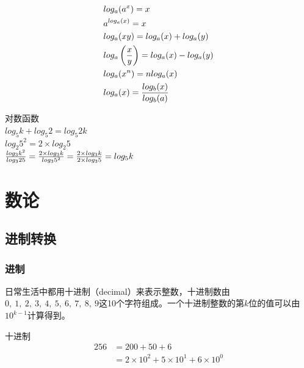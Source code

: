 \documentclass[12pt, openany, oneside]{book}
\begin{document}
\begin{tcolorbox}
	\begin{align}
		 & log_a(a^x) = x                                      \\
		 & a^{log_a(x)} = x                                    \\
		 & log_a(xy) = log_a(x) + log_a(y)                     \\
		 & log_a\left({x \over y}\right) = log_a(x) - log_a(y) \\
		 & log_a(x^n) = nlog_a(x)                              \\
		 & log_a(x) = {log_b(x) \over log_b(a)}
	\end{align}
\end{tcolorbox}

\begin{tcolorbox}
	对数函数\\
	$ log_5{k} + log_5{2} = log_5{2k} $\\
	$ log_2{5^2} = 2 \times log_2{5} $\\
	$ {log_3{k^2} \over log_3{25}} = {2 \times log_3{k} \over log_3{5^2}} = {2 \times log_3{k} \over 2 \times log_3{5}} = log_5{k} $
\end{tcolorbox}

\newpage

\chapter{数论}

\section{进制转换}

\subsection{进制}

日常生活中都用十进制（decimal）来表示整数，十进制数由$ 0,\ 1,\ 2,\ 3,\ 4,\ 5,\ 6,\ 7,\ 8,\ 9 $这10个字符组成。一个十进制整数的第$ k $位的值可以由$ 10^{k-1} $计算得到。

\begin{tcolorbox}
	十进制
	\begin{align*}
		256 & = 200 + 50 + 6                                  \\
		    & = 2 \times 10^2 + 5 \times 10^1 + 6 \times 10^0
	\end{align*}
\end{tcolorbox}
\end{document}
